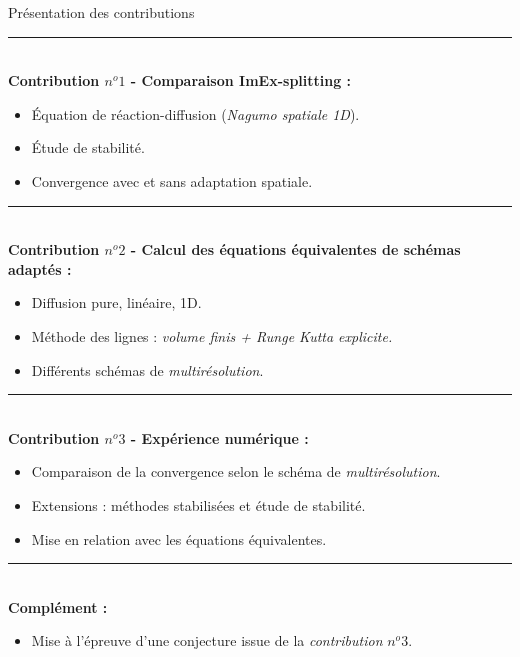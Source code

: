 \begin{frame}{Présentation des contributions}
    \noindent\color{Primary}\rule{\linewidth}{0.6pt}\\
    \textbf{Contribution $n^o1$ - Comparaison ImEx-splitting :\\}\color{black}
    \begin{itemize}
        \item Équation de réaction-diffusion (\emph{Nagumo spatiale 1D}).
        \item Étude de stabilité.
        \item Convergence avec et sans adaptation spatiale.
    \end{itemize}\pause
    \noindent\color{Primary}\rule{\linewidth}{0.6pt}\\
    \textbf{Contribution $n^o2$ - Calcul des équations équivalentes de schémas adaptés :\\}\color{black}
    \begin{itemize}
        \item Diffusion pure, linéaire, 1D.
        \item Méthode des lignes : \emph{volume finis + Runge Kutta explicite.}
        \item Différents schémas de \emph{multirésolution}.
    \end{itemize}\pause
    \noindent\color{Primary}\rule{\linewidth}{0.6pt}\\
    \textbf{Contribution $n^o3$ - Expérience numérique :\\}\color{black}

    \begin{itemize}
        \item Comparaison de la convergence selon le schéma de \emph{multirésolution}.
        \item Extensions : méthodes stabilisées et étude de stabilité.
        \item Mise en relation avec les équations équivalentes.
    \end{itemize}\pause
    \noindent\color{red!50}\rule{\linewidth}{0.6pt}\\
    \textbf{Complément :\\}\color{black}
    \begin{itemize}
        \item Mise à l’épreuve d'une conjecture issue de la \emph{contribution} $n^o 3$.
    \end{itemize}
\end{frame}
